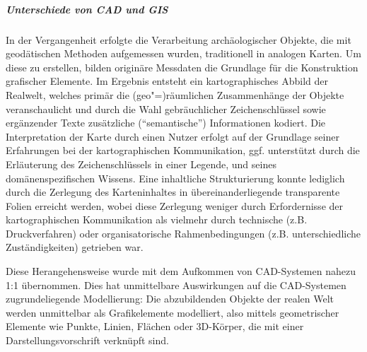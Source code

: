 \subparagraph{Unterschiede von CAD und GIS}
In der Vergangenheit erfolgte die Verarbeitung archäologischer Objekte, die mit geodätischen Methoden aufgemessen wurden, traditionell in analogen Karten. Um diese zu erstellen, bilden originäre Messdaten die Grundlage für die Konstruktion grafischer Elemente. Im Ergebnis entsteht ein kartographisches Abbild der Realwelt, welches primär die (geo"=)räumlichen Zusammenhänge der Objekte veranschaulicht und durch die Wahl gebräuchlicher Zeichenschlüssel sowie ergänzender Texte zusätzliche ("`semantische"') Informationen kodiert. Die Interpretation der Karte durch einen Nutzer erfolgt auf der Grundlage seiner Erfahrungen bei der kartographischen Kommunikation, ggf. unterstützt durch die Erläuterung des Zeichenschlüssels in einer Legende, und seines domänenspezifischen Wissens. Eine inhaltliche Strukturierung konnte lediglich durch die Zerlegung des Karteninhaltes in übereinanderliegende transparente Folien erreicht werden, wobei diese Zerlegung weniger durch Erfordernisse der kartographischen Kommunikation als vielmehr durch technische (z.B. Druckverfahren) oder organisatorische Rahmenbedingungen (z.B. unterschiedliche Zuständigkeiten) getrieben war.

Diese Herangehensweise wurde mit dem Aufkommen von CAD-Systemen nahezu 1:1 übernommen. Dies hat unmittelbare Auswirkungen auf die CAD-Systemen zugrundeliegende Modellierung: Die abzubildenden Objekte der realen Welt werden unmittelbar als Grafikelemente modelliert, also mittels geometrischer Elemente wie Punkte, Linien, Flächen oder 3D-Körper, die mit einer Darstellungsvorschrift verknüpft sind.


